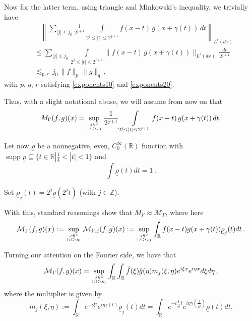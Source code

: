 \documentclass{amsart}
\newcommand{\R}{\mathbb{R}}
\newcommand{\Z}{\mathbb{Z}}
\newcommand{\M}{\mathcal{M}}
\theoremstyle{definition}
\theoremstyle{remark}
\DeclareMathOperator{\supp}{supp}
\numberwithin{equation}{section}
\begin{document}
Now for the latter term, using triangle and Minkowski's inequality, we trivially have
\begin{align*}
&\:\:\:\:\left\|\sum_{|j|\leq j_0} \frac{1}{2^{j+1}} \int\limits_{2^j\le|t|\le2^{j+1}} f(x-t)\,g(x+\gamma(t))\,dt\right\|_{L^r(dx)}\\
&\leq  \sum_{|j|\leq j_0} \int\limits_{2^j\le|t|\le2^{j+1}} \|f(x-t)\,g(x+\gamma(t))\|_{L^r(dx)}\,\frac{dt}{2^{j+1}}\\
&\lesssim_{p,r} \,j_0\,\|f\|_p\,\|g\|_{q}\,,
\end{align*}
with $p,\,q,\,r$ satisfying \eqref{exponents10} and \eqref{exponents20}.

Thus, with a slight notational abuse, we will assume from now on that
\begin{equation}\label{discretizationc}
M_{\Gamma}(f,g)(x)=\sup\limits_{{j\in\Z}\atop{|j|>j_0}}\frac{1}{2^{j+1}}\int\limits_{2^j\le|t|\le2^{j+1}} f(x-t)\,g(x+\gamma(t))\,dt.
\end{equation}


Let now $\underline{\rho}$ be a nonnegative, even, $C^\infty_0(\R)$ function with $\supp \underline{\rho} \subseteq\{t\in\R|\frac{1}{4}<|t|<1\}$ and
\begin{equation}\label{intones}
\int\underline{\rho}(t)dt=1\,.
\end{equation}

Set $\underline{\rho}_j(t)=2^j\underline{\rho}(2^j t)$ (with $j\in\Z$).

With this, standard reasonings show that $M_{\Gamma}\approx \M_{\Gamma}$, where here
\begin{equation}
\M_{\Gamma}(f,g)(x):=\sup\limits_{{j\in\Z}\atop{|j|>j_0}}\M_{\Gamma,j}(f,g)(x):=\sup\limits_{{j\in\Z}\atop{|j|>j_0}}\int_\R f(x-t)g(x+\gamma(t))\underline{\rho}_j(t)dt\,.
\end{equation}

Turning our attention on the Fourier side, we have that
\begin{equation}\label{M_multiplier}
 \M_\Gamma(f,g)(x)=\sup\limits_{{j\in\Z}\atop{|j|>j_0}} \int_\R\int_\R \hat{f}(\xi)\hat{g}(\eta)m_j(\xi,\eta)e^{i\xi x}e^{i\eta x}d\xi d\eta\,,
\end{equation}
where the multiplier is given by
\begin{equation}\label{M_multiplierr}
 m_j(\xi,\eta):=\int_\R e^{-i\xi t}e^{i\eta \gamma(t)} \underline{\rho}_j(t)dt
=\int_\R e^{-i\frac{\xi}{2^j} t}e^{i\eta \gamma(\frac{t}{2^j})} \underline{\rho}(t)dt.
\end{equation}
\end{document}
